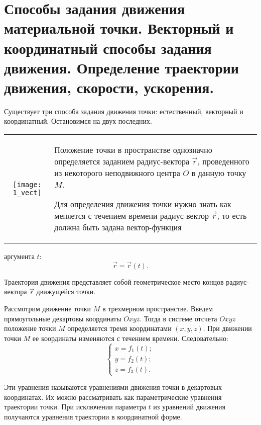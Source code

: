 \chapter{Способы задания движения материальной точки. Векторный и координатный
способы задания движения. Определение траектории движения, скорости, ускорения.}

\vspace*{1em}
Существует три способа задания движения точки: естественный, векторный и
координатный. Остановимся на двух последних.

\begin{table}[h!]
    \begin{tabular}{C{.4}m{.55\textwidth}}
        \texttt{[image: 1\_vect]} &
        Положение точки в пространстве однозначно определяется заданием
        радиус-вектора \( \vec{r} \), проведенного из некоторого неподвижного
        центра \( O \) в данную точку \( M \).
        
        Для определения движения точки нужно знать как меняется с течением
        времени радиус-вектор \( \vec{r} \), то есть должна быть задана
        вектор-функция
    \end{tabular}
\end{table}

аргумента \( t \):
\[
    \vec{r} = \vec{r}(t).
\]

Траектория движения представляет собой геометрическое место концов
радиус-вектора \( \vec{r} \) движущейся точки.


Рассмотрим движение точки \( M \) в трехмерном пространстве. Введем
прямоугольные декартовы координаты \( Oxyz \). Тогда в системе отсчета
\( Oxyz \) положение точки \( M \) определяется тремя координатами
\( (x, y, z) \). При движении точки \( M \) ее координаты изменяются с течением
времени. Следовательно:
\[ \left\{ \begin{array}{l}
    x = f_1(t); \\
    y = f_2(t); \\
    z = f_3(t).
\end{array} \right. \]

Эти уравнения называются уравнениями движения точки в декартовых координатах. Их
можно рассматривать как параметрические уравнения траектории точки. При
исключении параметра \( t \) из уравнений движения получаются уравнения
траектории в координатной форме.

